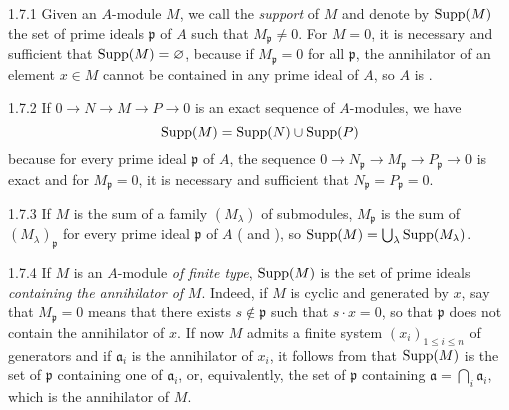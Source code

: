 \documentclass[10pt,oneside]{book}
\begin{document}
\begin{env}{1.7.1}
\label{env-0.1.7.1}
Given an $A$-module $M$, we call the \emph{support} of $M$ and denote by ${\mathop{\mathrm{Supp}}\nolimits}(M)$
the set of prime ideals $\mathfrak{p}$ of $A$ such that $M_\mathfrak{p}\neq 0$. For $M=0$, it
is necessary and sufficient that ${\mathop{\mathrm{Supp}}\nolimits}(M)=\varnothing$, because if $M_\mathfrak{p}=0$ for all
$\mathfrak{p}$, the annihilator of an element $x\in M$ cannot be contained in any prime
ideal of $A$, so $A$ is .
\end{env}

\begin{env}{1.7.2}
\label{env-0.1.7.2}
If $0\to N\to M\to P\to 0$ is an exact sequence of $A$-modules, we have
\[
  {\mathop{\mathrm{Supp}}\nolimits}(M)={\mathop{\mathrm{Supp}}\nolimits}(N)\cup{\mathop{\mathrm{Supp}}\nolimits}(P)
\]
because for every prime ideal $\mathfrak{p}$ of $A$, the sequence
${0\to N_\mathfrak{p}\to M_\mathfrak{p}\to P_\mathfrak{p}\to 0}$ is exact 
and for $M_\mathfrak{p}=0$, it is necessary and sufficient that
$N_\mathfrak{p}=P_\mathfrak{p}=0$.
\end{env}

\begin{env}{1.7.3}
\label{env-0.1.7.3}
If $M$ is the sum of a family $(M_\lambda)$ of submodules, $M_\mathfrak{p}$ is the sum
of $(M_\lambda)_\mathfrak{p}$ for every prime ideal $\mathfrak{p}$ of $A$
( and ), so ${\mathop{\mathrm{Supp}}\nolimits}(M)=\bigcup_\lambda{\mathop{\mathrm{Supp}}\nolimits}(M_\lambda)$.
\end{env}

\begin{env}{1.7.4}
\label{env-0.1.7.4}
If $M$ is an $A$-module \emph{of finite type}, ${\mathop{\mathrm{Supp}}\nolimits}(M)$ is the set of prime
ideals \emph{containing the annihilator of} $M$. Indeed, if $M$ is cyclic and
generated by $x$, say that $M_\mathfrak{p}=0$ means that there exists $s\not\in\mathfrak{p}$
such that $s\cdot x=0$, so that $\mathfrak{p}$ does not contain the annihilator of $x$.
If now $M$ admits a finite system $(x_i)_{1\leqslant i\leqslant n}$ of generators and if
$\mathfrak{a}_i$ is the annihilator of $x_i$, it follows from  that
${\mathop{\mathrm{Supp}}\nolimits}(M)$ is the set of $\mathfrak{p}$ containing one of $\mathfrak{a}_i$, or, equivalently,
the set of $\mathfrak{p}$ containing $\mathfrak{a}=\bigcap_i\mathfrak{a}_i$, which is the
annihilator of $M$.
\end{env}
\end{document}
